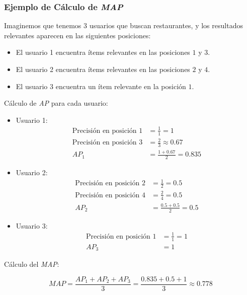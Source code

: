 \documentclass[11pt,a4paper,twoside]{thesis}
\begin{document}
\subsubsection{Ejemplo de Cálculo de \textit{MAP}}

Imaginemos que tenemos 3 usuarios que buscan restaurantes, y los resultados relevantes aparecen en las siguientes posiciones:

\begin{itemize}
	\item El usuario 1 encuentra ítems relevantes en las posiciones $1$ y $3$.
	\item El usuario 2 encuentra ítems relevantes en las posiciones $2$ y $4$.
	\item El usuario 3 encuentra un ítem relevante en la posición $1$.
\end{itemize}

Cálculo de \textit{AP} para cada usuario:

\begin{itemize}
	\item Usuario 1:
	      \begin{align*}
		      \text{Precisión en posición 1} & = \frac{1}{1} = 1            \\
		      \text{Precisión en posición 3} & = \frac{2}{3} \approx 0.67   \\
		      AP_1                           & = \frac{1 + 0.67}{2} = 0.835
	      \end{align*}

	\item Usuario 2:
	      \begin{align*}
		      \text{Precisión en posición 2} & = \frac{1}{2} = 0.5         \\
		      \text{Precisión en posición 4} & = \frac{2}{4} = 0.5         \\
		      AP_2                           & = \frac{0.5 + 0.5}{2} = 0.5
	      \end{align*}

	\item Usuario 3:
	      \begin{align*}
		      \text{Precisión en posición 1} & = \frac{1}{1} = 1 \\
		      AP_3                           & = 1
	      \end{align*}
\end{itemize}

Cálculo del \textit{MAP}:

\[
	MAP = \frac{AP_1 + AP_2 + AP_3}{3} = \frac{0.835 + 0.5 + 1}{3} \approx 0.778
\]
\end{document}
